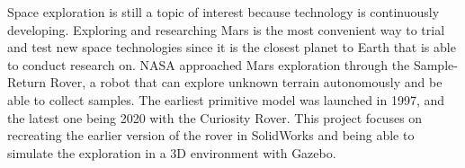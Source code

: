 \noindent
Space exploration is still a topic of interest because technology is continuously developing. Exploring and researching Mars is the most convenient way to trial and test new space technologies since it is the closest planet to Earth that is able to conduct research on. NASA approached Mars exploration through the Sample-Return Rover, a robot that can explore unknown terrain autonomously and be able to collect samples. The earliest primitive model was launched in 1997, and the latest one being 2020 with the Curiosity Rover. This project focuses on recreating the earlier version of the rover in SolidWorks and being able to simulate the exploration in a 3D environment with Gazebo.\\